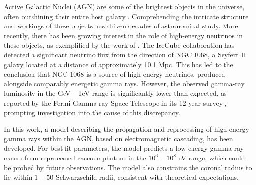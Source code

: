 Active Galactic Nuclei (AGN) are some of the brightest objects in the universe, often outshining their entire host galaxy \citep{RadiativeProcesses}. Comprehending the intricate structure and workings of these objects has driven decades of astronomical study. More recently, there has been growing interest in the role of high-energy neutrinos in these objects, as exemplified by the work of \citet{Eichmann_2022}. The IceCube collaboration \citep{IceCube2022} has detected a significant neutrino flux from the direction of NGC 1068, a Seyfert II galaxy located at a distance of approximately 10.1 Mpc. This has led to the conclusion that NGC 1068 is a source of high-energy neutrinos, produced alongside comparably energetic gamma rays. However, the observed gamma-ray luminosity in the GeV - TeV range is significantly lower than expected, as reported by the Fermi Gamma-ray Space Telescope in its 12-year survey \citep{Fermi12yeardata}, prompting investigation into the cause of this discrepancy.

In this work, a model describing the propagation and reprocessing of high-energy gamma rays within the AGN, based on electromagnetic cascading, has been developed. For best-fit parameters, the model predicts a low-energy gamma-ray excess from reprocessed cascade photons in the $10^6-10^8$ eV range, which could be probed by future observations. The model also constrains the coronal radius to lie within $1-50$ Schwarzschild radii, consistent with theoretical expectations.